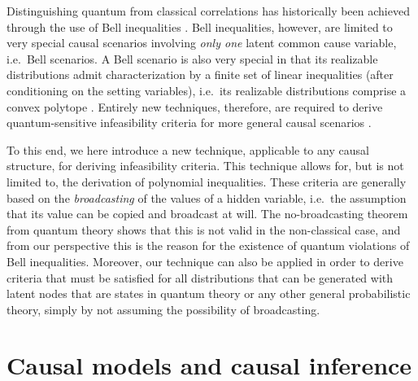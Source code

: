 Distinguishing quantum from classical correlations has historically been achieved through the use of Bell inequalities \cite{bell1966lhvm,GisinFramework2012,scarani2012device,Brunner2013Bell,BancalDIApproach}. Bell inequalities, however, are limited to very special causal scenarios involving \emph{only one} latent common cause variable, i.e.~Bell scenarios. A Bell scenario is also very special in that its realizable distributions admit characterization by a finite set of linear inequalities (after conditioning on the setting variables), i.e.~its realizable distributions comprise a convex polytope \cite{GisinFramework2012,FritzDuality}. %
Entirely new techniques, therefore, are required to derive quantum-sensitive infeasibility criteria for more general causal scenarios \cite{fritz2012bell,pusey2014gdag,BeyondBellII}. 

To this end, we here introduce a new technique, applicable to any causal structure, for deriving infeasibility criteria. This technique allows for, but is not limited to, the derivation of polynomial inequalities.
These criteria are generally based on the \emph{broadcasting} of the values of a hidden variable, i.e.~the assumption that its value can be copied and broadcast at will. The no-broadcasting theorem from quantum theory shows that this is not valid in the non-classical case, and from our perspective this is the reason for the existence of quantum violations of Bell inequalities. Moreover, our technique can also be applied in order to derive criteria that must be satisfied for all distributions that can be generated with latent nodes that are states in quantum theory or any other general probabilistic theory, simply by not assuming the possibility of broadcasting.

\section{Causal models and causal inference}\label{sec:definitions}

